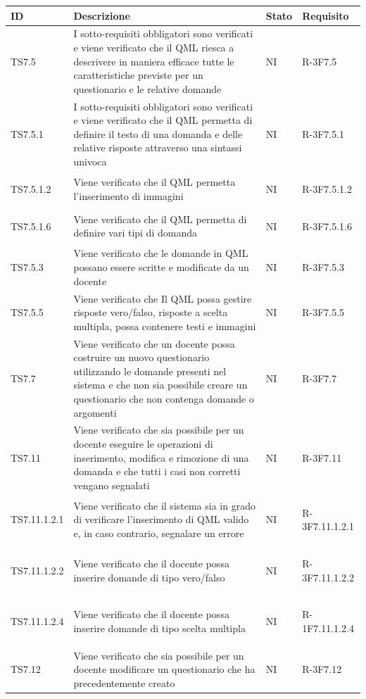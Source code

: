 \documentclass[12pt,a4paper]{article}
\begin{document}
	\begin{longtable}{l p{10cm} l l}
		\midrule
		\textbf{ID} & \textbf{Descrizione} & \textbf{Stato} & \textbf{Requisito} \tabularnewline
		\midrule
		\midrule
		TS7.5 & I sotto-requisiti obbligatori sono verificati e viene verificato che il QML riesca a descrivere in maniera efficace tutte le caratteristiche previste per un questionario e le relative domande & NI& \hypertarget{R-3F7.5}{R-3F7.5}\tabularnewline
		\midrule
		TS7.5.1 & I sotto-requisiti obbligatori sono verificati e viene verificato che il QML permetta di definire il testo di una domanda e delle relative risposte attraverso una sintassi univoca & NI& \hypertarget{R-3F7.5.1}{R-3F7.5.1}\tabularnewline
		\midrule
		TS7.5.1.2 & Viene verificato che il QML permetta l'inserimento di immagini & NI& \hypertarget{R-3F7.5.1.2}{R-3F7.5.1.2}\tabularnewline
		\midrule
		TS7.5.1.6 & Viene verificato che il QML permetta di definire vari tipi di domanda & NI& \hypertarget{R-3F7.5.1.6}{R-3F7.5.1.6}\tabularnewline
		\midrule
		TS7.5.3 & Viene verificato che le domande in QML possano essere scritte e modificate da un docente & NI& \hypertarget{R-3F7.5.3}{R-3F7.5.3}\tabularnewline
		\midrule
		TS7.5.5 & Viene verificato che Il QML possa gestire risposte vero/falso, risposte a scelta multipla, possa contenere testi e immagini	 & NI& \hypertarget{R-3F7.5.5}{R-3F7.5.5}\tabularnewline
		\midrule
		TS7.7 & Viene verificato che un docente possa costruire un nuovo questionario utilizzando le domande presenti nel sistema e che non sia possibile creare un questionario che non contenga domande o argomenti
		& NI& \hypertarget{R-3F7.7}{R-3F7.7}\tabularnewline
		\midrule
		TS7.11 & Viene verificato che sia possibile per un docente eseguire le operazioni di inserimento, modifica e rimozione di una domanda e che tutti i casi non corretti vengano segnalati & NI& \hypertarget{R-3F7.11}{R-3F7.11}\tabularnewline
		\midrule
		TS7.11.1.2.1 & Viene verificato che il sistema sia in grado di verificare l'inserimento di QML valido e, in caso contrario, segnalare un errore & NI& \hypertarget{R-3F7.11.1.2.1}{R-3F7.11.1.2.1}\tabularnewline
		\midrule
		TS7.11.1.2.2 & Viene verificato che il docente possa inserire domande di tipo vero/falso	 & NI& \hypertarget{R-3F7.11.1.2.2}{R-3F7.11.1.2.2}\tabularnewline
		\midrule
		TS7.11.1.2.4 & Viene verificato che il docente possa inserire domande di tipo scelta multipla & NI& \hypertarget{R-1F7.11.1.2.4}{R-1F7.11.1.2.4}\tabularnewline
		\midrule
		TS7.12 & Viene verificato che sia possibile per un docente modificare un questionario che ha precedentemente creato & NI& \hypertarget{R-3F7.12}{R-3F7.12}\tabularnewline

\end{longtable}
\end{document}
